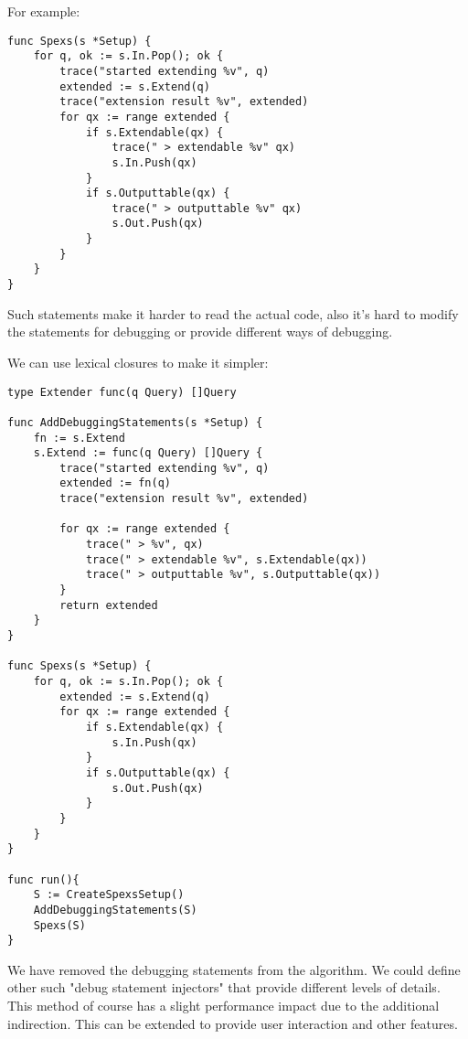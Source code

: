 For example:

\begin{lstlisting}
func Spexs(s *Setup) {
    for q, ok := s.In.Pop(); ok {
        trace("started extending %v", q)
        extended := s.Extend(q)
        trace("extension result %v", extended)
        for qx := range extended {
            if s.Extendable(qx) {
                trace(" > extendable %v" qx)
                s.In.Push(qx)
            }
            if s.Outputtable(qx) {
                trace(" > outputtable %v" qx)
                s.Out.Push(qx)
            }
        }
    }
}
\end{lstlisting}

Such statements make it harder to read the actual code, also it's hard to modify the statements for debugging or provide different ways of debugging.

We can use lexical closures to make it simpler:

\begin{lstlisting}
type Extender func(q Query) []Query

func AddDebuggingStatements(s *Setup) {
    fn := s.Extend
    s.Extend := func(q Query) []Query {
        trace("started extending %v", q)
        extended := fn(q)
        trace("extension result %v", extended)
        
        for qx := range extended {
            trace(" > %v", qx)
            trace(" > extendable %v", s.Extendable(qx))
            trace(" > outputtable %v", s.Outputtable(qx))
        }
        return extended
    }
}

func Spexs(s *Setup) {
    for q, ok := s.In.Pop(); ok {
        extended := s.Extend(q)
        for qx := range extended {
            if s.Extendable(qx) {
                s.In.Push(qx)
            }
            if s.Outputtable(qx) {
                s.Out.Push(qx)
            }
        }
    }
}

func run(){
    S := CreateSpexsSetup()
    AddDebuggingStatements(S)
    Spexs(S)
}
\end{lstlisting}

We have removed the debugging statements from the algorithm. We could define other such "debug statement injectors" that provide different levels of details. This method of course has a slight performance impact due to the additional indirection. This can be extended to provide user interaction and other features.